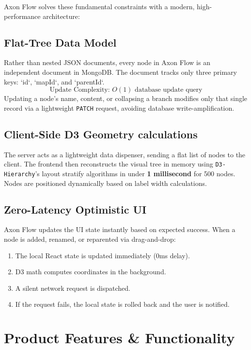 \documentclass[12pt, a4paper]{article}
\begin{document}
Axon Flow solves these fundamental constraints with a modern, high-performance architecture:

\subsection{Flat-Tree Data Model}
Rather than nested JSON documents, every node in Axon Flow is an independent document in MongoDB. The document tracks only three primary keys: `id`, `mapId`, and `parentId`. 
$$\text{Update Complexity: } O(1) \text{ database update query}$$
Updating a node's name, content, or collapsing a branch modifies only that single record via a lightweight \texttt{PATCH} request, avoiding database write-amplification.

\subsection{Client-Side D3 Geometry calculations}
The server acts as a lightweight data dispenser, sending a flat list of nodes to the client. The frontend then reconstructs the visual tree in memory using \texttt{D3-Hierarchy}'s layout stratify algorithms in under \textbf{1 millisecond} for 500 nodes. Nodes are positioned dynamically based on label width calculations.

\subsection{Zero-Latency Optimistic UI}
Axon Flow updates the UI state instantly based on expected success. When a node is added, renamed, or reparented via drag-and-drop:
\begin{enumerate}[label=\alph*)]
  \item The local React state is updated immediately (0ms delay).
  \item D3 math computes coordinates in the background.
  \item A silent network request is dispatched.
  \item If the request fails, the local state is rolled back and the user is notified.
\end{enumerate}

\section{Product Features \& Functionality}
\end{document}

